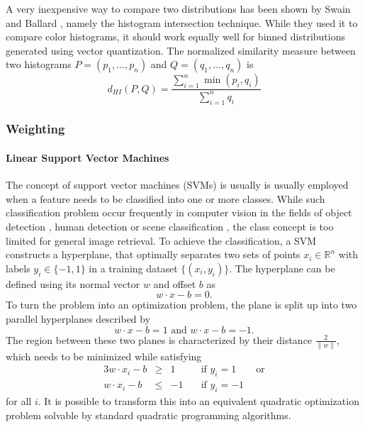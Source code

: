 A very inexpensive way to compare two distributions has been shown by Swain and
Ballard \autocite{swain_color_1991}, namely the histogram intersection
technique. While they used it to compare color histograms, it should work
equally well for binned distributions generated using vector quantization. The
normalized similarity measure between two histograms $P = (p_1, \dots, p_n)$
and $Q = (q_1, \dots, q_n)$ is
\begin{equation*}
    d_{HI}(P, Q) = \frac{\sum_{i=1}^n \min (p_i, q_i)}{\sum_{i=1}^n q_i}
\end{equation*}

\subsubsection{Weighting}

\paragraph{Linear Support Vector Machines}

The concept of support vector machines (SVMs) is usually is usually employed
when a feature needs to be classified into one or more classes. While such
classification problem occur frequently in computer vision in the fields of
object detection \autocite{pontil_support_1998} \autocite{csurka_visual_2004},
human detection \autocite{dalal_histograms_2005} or scene classification
\autocite{yang_evaluating_2007}, the class concept is too limited for general
image retrieval. To achieve the classification, a SVM constructs a hyperplane,
that optimally separates two sets of points $x_i \in \mathbb{R}^n$ with labels
$y_i \in \{-1, 1 \}$ in a training dataset $\{ (x_i, y_i) \}$. The hyperplane
can be defined using its normal vector $w$ and offset $b$ as
\begin{equation*}
    w \cdot x - b = 0.
\end{equation*}
To turn the problem into an optimization problem, the plane is split up into
two parallel hyperplanes described by
\begin{equation*}
    w \cdot x - b = 1 \text{ and } w \cdot x - b = -1.
\end{equation*}
The region between these two planes is characterized by their distance
$\frac{2}{\| w \|}$, which needs to be minimized while satisfying
\begin{alignat*}{3}
    w \cdot x_i - b & \geq & 1 & \quad \text{if } y_i = 1 \qquad \text{or} \\
    w \cdot x_i - b & \leq & -1 & \quad \text{if } y_i = -1
\end{alignat*}
for all $i$. It is possible to transform this into an equivalent quadratic
optimization problem solvable by standard quadratic programming algorithms.

